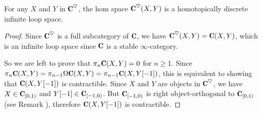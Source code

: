 \documentclass[a4paper,12pt]{amsart}
\begin{document}
\begin{lemma}
For any $X$ and $Y$ in $\C^\heart$, the hom space $\C^\heart(X,Y)$ is a homotopically discrete infinite loop space.
\end{lemma}
\begin{proof}
Since $\C^\heart$ is a full subcategory of $\C$, we have $\C^\heart(X,Y)=\C(X,Y)$, which is an infinite loop space since $\C$ is a stable $\infty$-category. 

So we are left to prove that $\pi_n\C(X,Y)=0$ for $n\geq 1$. Since $\pi_n\C(X,Y)=\pi_{n-1}\Omega\C(X,Y)=\pi_{n-1}\C(X,Y[-1])$, this is equivalent to showing that 
$\C(X,Y[-1])$ is contractible. Since $X$ and $Y$ are objects in $\C^\heart$, we have $X\in \C_{[0,1)}$ and $Y[-1]\in \C_{[-1,0)}$. But $\C_{[-1,0)}$ is right object-orthogonal to $\C_{[0,1)}$ (see Remark ), therefore $\C(X,Y[-1])$ is contractible.
\end{proof}
\end{document}

